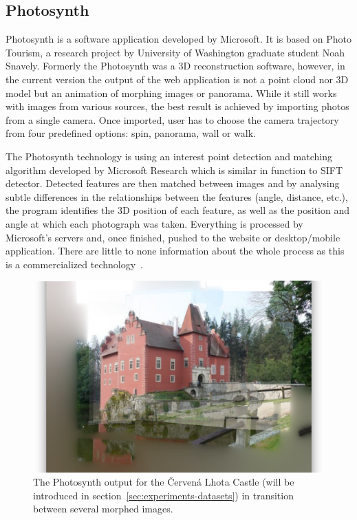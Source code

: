 \subsection*{Photosynth}
Photosynth is a software application developed by Microsoft. It is based on Photo Tourism, a research project by University of Washington graduate student Noah Snavely. Formerly the Photosynth was a 3D reconstruction software, however, in the current version the output of the web application is not a point cloud nor 3D model but an animation of morphing images or panorama. While it still works with images from various sources, the best result is achieved by importing photos from a single camera. Once imported, user has to choose the camera trajectory from four predefined options: spin, panorama, wall or walk. 

The Photosynth technology is using an interest point detection and matching algorithm developed by Microsoft Research which is similar in function to SIFT detector. Detected features are then matched between images and by analysing subtle differences in the relationships between the features (angle, distance, etc.), the program identifies the 3D position of each feature, as well as the position and angle at which each photograph was taken. Everything is processed by Microsoft's servers and, once finished, pushed to the website or desktop/mobile application. There are little to none information about the whole process as this is a commercialized technology~\cite{www:photosynth}.

\begin{figure}[ht]
	\begin{center}
		\includegraphics[keepaspectratio,width=\textwidth]{fig/Photosynth.png}
	\end{center}
	\caption{The Photosynth output for the Červená Lhota Castle (will be introduced in section~\ref{sec:experiments-datasets}) in transition between several morphed images.}
	\label{fig:photosynth}
\end{figure}

